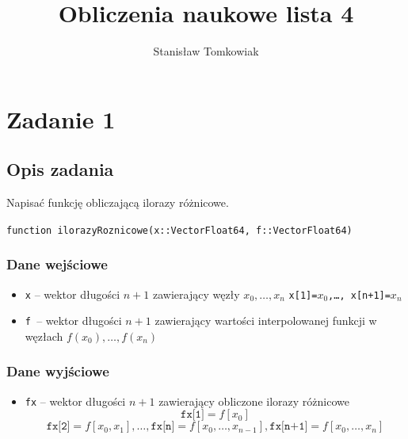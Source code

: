 \documentclass{article}
\title{Obliczenia naukowe lista 4}
\author{Stanisław Tomkowiak}
\begin{document}
\maketitle


\section*{Zadanie 1}
\subsection*{Opis zadania}
Napisać funkcję obliczającą ilorazy różnicowe.

\texttt{function ilorazyRoznicowe(x::Vector{Float64}, f::Vector{Float64})}
\subsubsection*{Dane wejściowe}
\begin{itemize}
    \item \texttt{x} – wektor długości $n + 1$ zawierający węzły $x_0, \ldots , x_n$
\texttt{x[1]=$x_0$,\ldots, x[n+1]=$x_n$}
    \item \texttt{f }– wektor długości $n + 1$ zawierający wartości interpolowanej
funkcji w węzłach $f(x_0), \ldots, f (x_n)$
\end{itemize}
\subsubsection*{Dane wyjściowe}
\begin{itemize}
    \item \texttt{fx} – wektor długości $n + 1$ zawierający obliczone ilorazy różnicowe
\[
\texttt{fx[1]}=f[x_0]
\]
\[
\texttt{fx[2]}=f [x_0, x_1],\ldots, \texttt{fx[n]}=f[x_0,\ldots , x_{n-1}], \texttt{fx[n+1]}=f [x_0,\ldots, x_n]
\]
\end{itemize}
\end{document}
